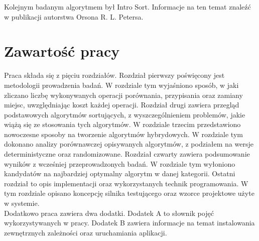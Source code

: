 Kolejnym badanym algorytmem był Intro Sort. Informacje na ten temat znaleźć w publikacji  \cite{IntroSort} autorstwa Orsona R. L. Petersa.\\

\section*{Zawartość pracy}
Praca składa się z pięciu rozdziałów.
Rozdział pierwszy poświęcony jest metodologii prowadzenia badań. W rozdziale tym wyjaśniono sposób, w jaki zliczano liczbę wykonywanych operacji porównania, przypisania oraz zamiany miejsc, uwzględniając koszt każdej operacji.
Rozdział drugi zawiera przegląd podstawowych algorytmów sortujących, z wyszczególnieniem problemów, jakie wiążą się ze stosowania tych algorytmów.
W rozdziale trzecim przedstawiono nowoczesne sposoby na tworzenie algorytmów hybrydowych. W rozdziale tym dokonano analizy porównawczej opisywanych algorytmów, z podziałem na wersje deterministyczne oraz randomizowane.
Rozdział czwarty zawiera podsumowanie wyników z wcześniej przeprowadzonych badań. W rozdziale tym wyłoniono kandydatów na najbardziej optymalny algorytm w danej kategorii.
Ostatni rozdział to opis implementacji oraz wykorzystanych technik programowania. W tym rozdziale opisano koncepcję silnika testującego oraz wzorce projektowe użyte w systemie.\\

Dodatkowo praca zawiera dwa dodatki.
Dodatek A to słownik pojęć wykorzystywanych w pracy.
Dodatek B zawiera informacje na temat instalowania zewnętrznych zależności oraz uruchamiania aplikacji.\\
